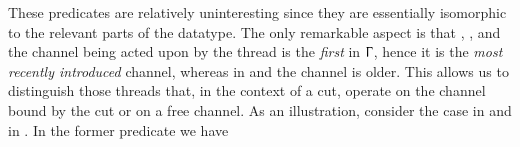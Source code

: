 These predicates are relatively uninteresting since they are essentially
isomorphic to the relevant parts of the  datatype. The
only remarkable aspect is that , ,
 and  the channel being acted upon by
the thread is the \emph{first} in $\Upgamma$, hence it is the \emph{most
recently introduced} channel, whereas in  and
 the channel is older. This allows us to distinguish
those threads that, in the context of a cut, operate on the channel bound by the
cut or on a free channel. As an illustration, consider the
 case in  and in
. In the former predicate we have

\begin{AgdaAlign}
\begin{code}[hide]%
\>[0]\AgdaSpace{}%
\AgdaSpace{}%
\<%
\\
\>[0][@{}l@{\AgdaIndent{0}}]%
\>[2]\AgdaSpace{}%
\AgdaSymbol{:}\<%
\\
\>[2][@{}l@{\AgdaIndent{0}}]%
\>[4]\AgdaSpace{}%
\AgdaSpace{}%
\AgdaSpace{}%
\AgdaSpace{}%
\AgdaSymbol{\}}\AgdaSpace{}%
\AgdaSymbol{(}\AgdaSpace{}%
\AgdaSymbol{:}\AgdaSpace{}%
\AgdaSpace{}%
\AgdaSpace{}%
\AgdaSymbol{)}\AgdaSpace{}%
\AgdaSymbol{(}\AgdaSpace{}%
\AgdaSymbol{:}\AgdaSpace{}%
\AgdaSpace{}%
\AgdaSpace{}%
\AgdaSpace{}%
\AgdaOperator{\AgdaDatatype{+}}\AgdaSpace{}%
\AgdaSymbol{)}\<%
\\
%
\>[4]\AgdaSymbol{\{}\AgdaSpace{}%
\AgdaSymbol{:}\AgdaSpace{}%
\AgdaSpace{}%
\AgdaSymbol{(}\AgdaSpace{}%
\AgdaSpace{}%
\AgdaSymbol{)\}}\AgdaSpace{}%
\AgdaSymbol{\{}\AgdaSpace{}%
\AgdaSymbol{:}\AgdaSpace{}%
\AgdaSpace{}%
\AgdaSymbol{(}\AgdaSpace{}%
\AgdaSpace{}%
\AgdaSymbol{)\}}\AgdaSpace{}%
\<%
\\
%
\>[4]\AgdaSpace{}%
\AgdaSymbol{(}\AgdaSpace{}%
\AgdaSpace{}%
\AgdaSpace{}%

\end{code}
\end{AgdaAlign}
